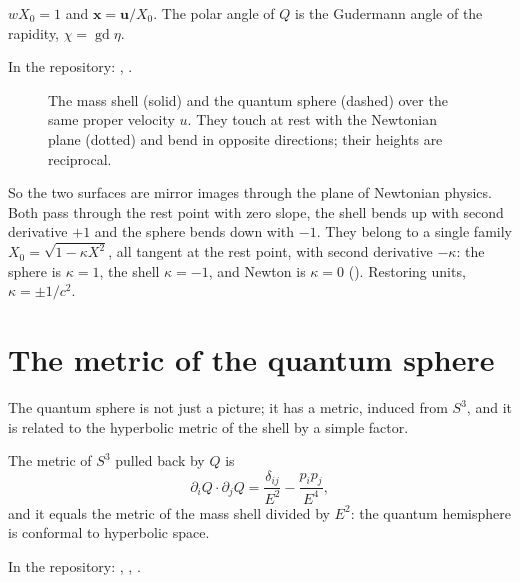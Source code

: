 \begin{proposition}\proved
$wX_0=1$ and $\mathbf x=\mathbf u/X_0$. The polar angle of $Q$ is the Gudermann angle of the rapidity, $\chi=\operatorname{gd}\eta$.
\end{proposition}
\noindent In the repository: , .

\begin{figure}[h]
\centering
{}
\caption{The mass shell (solid) and the quantum sphere (dashed) over the same proper velocity $u$. They touch at rest with the Newtonian plane (dotted) and bend in opposite directions; their heights are reciprocal.}
\label{fig:recip}
\end{figure}

So the two surfaces are mirror images through the plane of Newtonian physics. Both pass through the rest point with zero slope, the shell bends up with second derivative $+1$ and the sphere bends down with $-1$. They belong to a single family $X_0=\sqrt{1-\kappa X^2}$, all tangent at the rest point, with second derivative $-\kappa$: the sphere is $\kappa=1$, the shell $\kappa=-1$, and Newton is $\kappa=0$ (). Restoring units, $\kappa=\pm1/c^2$.

\section{The metric of the quantum sphere}

The quantum sphere is not just a picture; it has a metric, induced from $S^3$, and it is related to the hyperbolic metric of the shell by a simple factor.

\begin{proposition}\proved\label{prop:pullback}
The metric of $S^3$ pulled back by $Q$ is
\[
\partial_iQ\cdot\partial_jQ=\frac{\delta_{ij}}{E^2}-\frac{p_ip_j}{E^4},
\]
and it equals the metric of the mass shell divided by $E^2$: the quantum hemisphere is conformal to hyperbolic space.
\end{proposition}
\noindent In the repository: , , .

